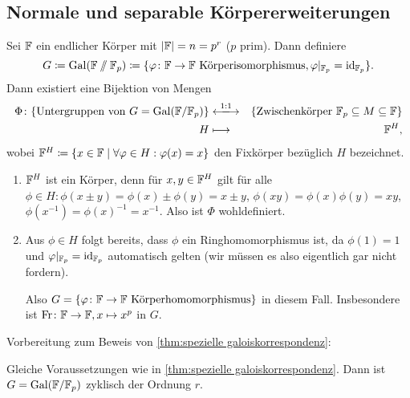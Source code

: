 \documentclass[12pt,a4paper]{scrartcl}
\begin{document}
\subsection{Normale und separable Körpererweiterungen}
\begin{satz}\label{thm:spezielle galoiskorrespondenz} Sei $\mathbb F$ ein endlicher Körper mit $|\mathbb F| = n = p^r$ \textup($p$ prim\textup). Dann definiere
\[
  G\coloneqq \operatorname{Gal}(\mathbb F\sslash\mathbb F_p)\coloneqq\{\varphi\colon \mathbb F\to\mathbb F \text{ Körperisomorphismus}, \varphi|_{\mathbb F_p} = \operatorname{id}_{\mathbb F_p} \}.
\]
Dann existiert eine Bijektion von Mengen
\begin{eqnarray*}
\Phi\colon	\{\text{Untergruppen von  $G$} = \Gal(\IF/\IF_p)\} & \xlongleftrightarrow{1:1} &\{\text{Zwischenkörper }\IF_p\subseteq M\subseteq \IF\}\\
	H &\longmapsto & \IF^H,
\end{eqnarray*}
wobei $\mathbb F^H \coloneqq \{x\in\mathbb F\mid\forall \varphi\in H:\varphi(x) = x\}$ den Fixkörper bezüglich $H$ bezeichnet.
\end{satz}
\begin{bem}
	\leavevmode
	\begin{enumerate}
		\item $\mathbb F^H$ ist ein Körper, denn für $x,y\in\mathbb F^H$ gilt für alle $\phi\in H: \phi(x\pm y) = \phi(x)\pm\phi(y) = x\pm y$, $\phi(xy) = \phi(x)\phi(y) = xy$, $\phi(x^{-1}) = \phi(x)^{-1} = x^{-1}$. Also ist $\Phi$ wohldefiniert.
		\item Aus $\phi\in H$ folgt bereits, dass $\phi$ ein Ringhomomorphismus ist, da $\phi(1) = 1$ und $\varphi|_{\mathbb F_p} = \operatorname{id}_{\mathbb F_p}$ automatisch gelten (wir müssen es also eigentlich gar nicht fordern). \label{bem:galoiskor:2}
		
		Also $G = \{\varphi\colon \mathbb F\to \mathbb F \text{ Körperhomomorphismus}\}$ in diesem Fall. Insbesondere ist $\operatorname{Fr}\colon \mathbb F\to\mathbb F, x\mapsto x^p$ in $G$.
	\end{enumerate}
\end{bem}
Vorbereitung zum Beweis von \cref{thm:spezielle galoiskorrespondenz}:
\begin{lem} \label{lem:19.2}
	Gleiche Voraussetzungen wie in \cref{thm:spezielle galoiskorrespondenz}. Dann ist $G = \operatorname{Gal}(\mathbb F/\mathbb F_p)$ zyklisch der Ordnung $r$.
\end{lem}
\end{document}
